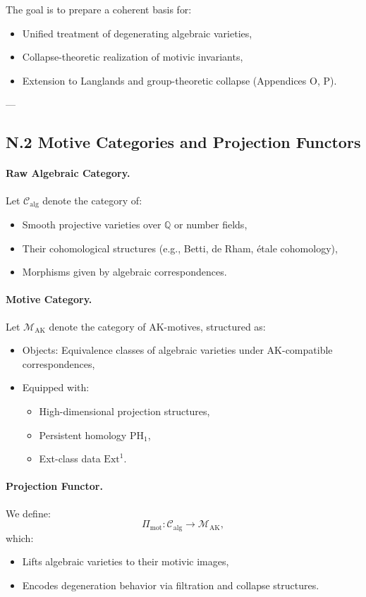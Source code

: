 \documentclass[11pt]{article}
\begin{document}
The goal is to prepare a coherent basis for:
\begin{itemize}
  \item Unified treatment of degenerating algebraic varieties,
  \item Collapse-theoretic realization of motivic invariants,
  \item Extension to Langlands and group-theoretic collapse (Appendices O, P).
\end{itemize}

---

\subsection*{N.2 Motive Categories and Projection Functors}

\paragraph{Raw Algebraic Category.}
Let \( \mathcal{C}_{\mathrm{alg}} \) denote the category of:
\begin{itemize}
  \item Smooth projective varieties over \( \mathbb{Q} \) or number fields,
  \item Their cohomological structures (e.g., Betti, de Rham, étale cohomology),
  \item Morphisms given by algebraic correspondences.
\end{itemize}

\paragraph{Motive Category.}
Let \( \mathcal{M}_{\mathrm{AK}} \) denote the category of AK-motives, structured as:
\begin{itemize}
  \item Objects: Equivalence classes of algebraic varieties under AK-compatible correspondences,
  \item Equipped with:
  \begin{itemize}
    \item High-dimensional projection structures,
    \item Persistent homology \( \mathrm{PH}_1 \),
    \item Ext-class data \( \mathrm{Ext}^1 \).
  \end{itemize}
\end{itemize}

\paragraph{Projection Functor.}
We define:
\[
\Pi_{\mathrm{mot}} : \mathcal{C}_{\mathrm{alg}} \longrightarrow \mathcal{M}_{\mathrm{AK}},
\]
which:
\begin{itemize}
  \item Lifts algebraic varieties to their motivic images,
  \item Encodes degeneration behavior via filtration and collapse structures.
\end{itemize}
\end{document}
